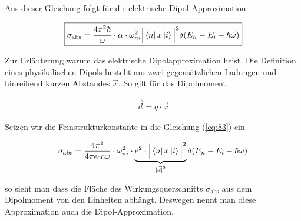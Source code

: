 Aus dieser Gleichung folgt für die elektrische Dipol-Approximation

\begin{align}
  \label{eq:83}
 \boxed{ \sigma_{\text{abs}}  = \frac{4 \pi^2 \hbar }{ \omega} \cdot \alpha \cdot \omega_{ni}^2  \Big|\left\langle n \right|x\left| i \right\rangle\Big|^2 \delta(E_n - E_i - \hbar\omega) }
\end{align}

Zur Erläuterung warum das elektrische Dipolapproximation heist. Die Definition eines physikalischen Dipols besteht aus zwei gegensätzlichen Ladungen und hinreihend kurzen Abstandes \(\vec x\). So gilt für das Dipolmoment

\begin{align}
  \label{eq:84}
  \vec d = q\cdot\vec x
\end{align}

Setzen wir die Feinstrukturkonstante in die Gleichung (\ref{eq:83}) ein

\begin{align}
  \label{eq:85}
  \sigma_{\text{abs}}  = \frac{4 \pi^2 }{4\pi \epsilon_0 c \omega} \cdot  \omega_{ni}^2 \cdot\underbr{ e^2\cdot \Big|\bra{n}x\ket{i}\Big|^2}_{|\vec d|^2} \delta(E_n - E_i - \hbar\omega) 
\end{align}

so sieht man dass die Fläche des Wirkungsquerschnitts \( \sigma_{\text{abs}} \) aus dem Dipolmoment von den Einheiten abhängt. Deswegen nennt man diese Approximation auch die Dipol-Approximation. 




